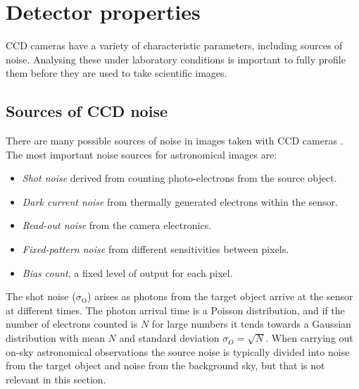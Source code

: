 \section{Detector properties}
\label{sec:detectors}
\begin{colsection}


\begin{colsection}

CCD cameras have a variety of characteristic parameters, including sources of noise. Analysing these under laboratory conditions is important to fully profile them before they are used to take scientific images.

\end{colsection}

\subsection{Sources of CCD noise}
\label{sec:noise}
\begin{colsection}

There are many possible sources of noise in images taken with CCD cameras \citep{CCDs}. The most important noise sources for astronomical images are:

\begin{itemize}
    \item \emph{Shot noise} derived from counting photo-electrons from the source object.
    \item \emph{Dark current noise} from thermally generated electrons within the sensor.
    \item \emph{Read-out noise} from the camera electronics.
    \item \emph{Fixed-pattern noise} from different sensitivities between pixels.
    \item \emph{Bias count}, a fixed level of output for each pixel.
\end{itemize}

The shot noise ($\sigma_\text{O}$) arises as photons from the target object arrive at the sensor at different times. The photon arrival time is a Poisson distribution, and if the number of electrons counted is $N$ for large numbers it tends towards a Gaussian distribution with mean $N$ and standard deviation $\sigma_O = \sqrt{N}$. When carrying out on-sky astronomical observations the source noise is typically divided into noise from the target object and noise from the background sky, but that is not relevant in this section.


\end{colsection}
\end{colsection}
